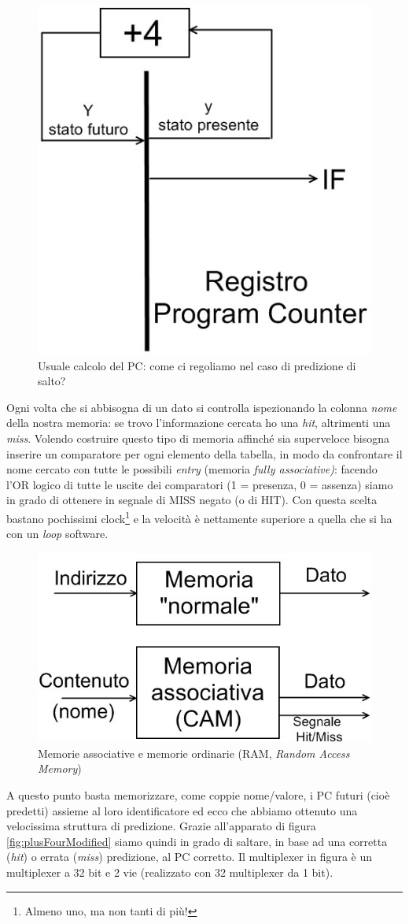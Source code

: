 \begin{figure}[!h]
\centering
\includegraphics[width=0.35\columnwidth]{img/plusFour}
\caption{Usuale calcolo del PC: come ci regoliamo nel caso di predizione di salto?}
\label{fig:plusFour}
\end{figure}

Ogni volta che si abbisogna di un dato si controlla ispezionando la colonna \textit{nome} della nostra memoria: se trovo l'informazione cercata ho una \textit{hit}, altrimenti una \textit{miss}.
Volendo costruire questo tipo di memoria affinché sia superveloce bisogna inserire un comparatore per ogni elemento della tabella, in modo da confrontare il nome cercato con tutte le possibili \textit{entry} (memoria \textit{fully associative)}: facendo l'OR logico di tutte le uscite dei comparatori (1 = presenza, 0 = assenza) siamo in grado di ottenere in segnale di MISS negato (o di HIT). Con questa scelta bastano pochissimi clock\footnote{Almeno uno, ma non tanti di più!} e la velocità è nettamente superiore a quella che si ha con un \textit{loop} software.

\begin{figure}[!h]
\centering
\includegraphics[width=0.4\columnwidth]{img/memVScam}
\caption{Memorie associative e memorie ordinarie (RAM, \textit{Random Access Memory})}
\label{fig:memVScam}
\end{figure}

A questo punto basta memorizzare, come coppie nome/valore, i PC futuri (cioè predetti) assieme al loro identificatore ed ecco che abbiamo ottenuto una velocissima struttura di predizione.
Grazie all'apparato di figura \ref{fig:plusFourModified} siamo quindi in grado di saltare, in base ad una corretta (\textit{hit}) o errata (\textit{miss}) predizione, al PC corretto. Il multiplexer in figura è un multiplexer a 32 bit e 2 vie (realizzato con 32 multiplexer da 1 bit).

